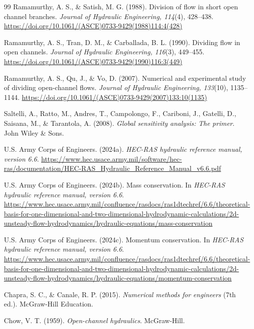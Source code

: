 \begin{thebibliography}{99}
Ramamurthy, A. S., \& Satish, M. G. (1988). Division of flow in short open channel branches. \emph{Journal of Hydraulic Engineering, 114}(4), 428--438. \url{https://doi.org/10.1061/(ASCE)0733-9429(1988)114:4(428)}

Ramamurthy, A. S., Tran, D. M., \& Carballada, B. L. (1990). Dividing flow in open channels. \emph{Journal of Hydraulic Engineering, 116}(3), 449--455. \url{https://doi.org/10.1061/(ASCE)0733-9429(1990)116:3(449)}

Ramamurthy, A. S., Qu, J., \& Vo, D. (2007). Numerical and experimental study of dividing open-channel flows. \emph{Journal of Hydraulic Engineering, 133}(10), 1135--1144. \url{https://doi.org/10.1061/(ASCE)0733-9429(2007)133:10(1135)}

Saltelli, A., Ratto, M., Andres, T., Campolongo, F., Cariboni, J., Gatelli, D., Saisana, M., \& Tarantola, A. (2008). \emph{Global sensitivity analysis: The primer}. John Wiley \& Sons.

U.S. Army Corps of Engineers. (2024a). \emph{HEC-RAS hydraulic reference manual, version 6.6}. \url{https://www.hec.usace.army.mil/software/hec-ras/documentation/HEC-RAS_Hydraulic_Reference_Manual_v6.6.pdf}

U.S. Army Corps of Engineers. (2024b). Mass conservation. In \emph{HEC-RAS hydraulic reference manual, version 6.6}. \url{https://www.hec.usace.army.mil/confluence/rasdocs/ras1dtechref/6.6/theoretical-basis-for-one-dimensional-and-two-dimensional-hydrodynamic-calculations/2d-unsteady-flow-hydrodynamics/hydraulic-equations/mass-conservation}

U.S. Army Corps of Engineers. (2024c). Momentum conservation. In \emph{HEC-RAS hydraulic reference manual, version 6.6}. \url{https://www.hec.usace.army.mil/confluence/rasdocs/ras1dtechref/6.6/theoretical-basis-for-one-dimensional-and-two-dimensional-hydrodynamic-calculations/2d-unsteady-flow-hydrodynamics/hydraulic-equations/momentum-conservation}

Chapra, S. C., \& Canale, R. P. (2015). \emph{Numerical methods for engineers} (7th ed.). McGraw-Hill Education.

Chow, V. T. (1959). \emph{Open-channel hydraulics}. McGraw-Hill.

\end{thebibliography}
